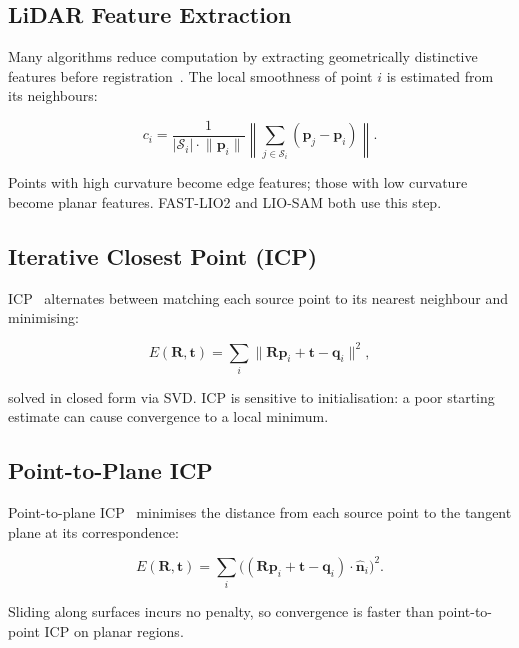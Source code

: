 \subsection{LiDAR Feature Extraction}

Many algorithms reduce computation by extracting geometrically distinctive
features before registration~\cite{zhang2014loam}.
The local smoothness of point $i$ is estimated from its neighbours:

\begin{equation}
  c_i = \frac{1}{\lvert \mathcal{S}_i \rvert \cdot \lVert \mathbf{p}_i \rVert}
        \left\lVert \sum_{j \in \mathcal{S}_i} (\mathbf{p}_j - \mathbf{p}_i) \right\rVert.
  \label{eq:smoothness}
\end{equation}

\noindent Points with high curvature become edge features; those with low
curvature become planar features. FAST-LIO2 and LIO-SAM both use this step.

\subsection{Iterative Closest Point (ICP)}

ICP~\cite{besl1992icp} alternates between matching each source point to its
nearest neighbour and minimising:

\begin{equation}
  E(\mathbf{R}, \mathbf{t}) = \sum_i \lVert \mathbf{R}\mathbf{p}_i + \mathbf{t} - \mathbf{q}_i \rVert^2,
  \label{eq:icp}
\end{equation}

\noindent solved in closed form via SVD. ICP is sensitive to initialisation:
a poor starting estimate can cause convergence to a local minimum.

\subsection{Point-to-Plane ICP}

Point-to-plane ICP~\cite{chen1991point} minimises the distance from each
source point to the tangent plane at its correspondence:

\begin{equation}
  E(\mathbf{R}, \mathbf{t}) =
    \sum_i \bigl((\mathbf{R}\mathbf{p}_i + \mathbf{t} - \mathbf{q}_i)
                 \cdot \hat{\mathbf{n}}_i \bigr)^2.
  \label{eq:icp_plane}
\end{equation}

\noindent Sliding along surfaces incurs no penalty, so convergence is faster
than point-to-point ICP on planar regions.

